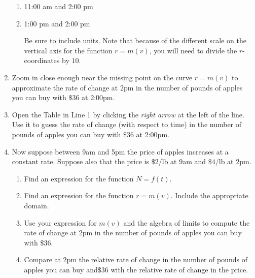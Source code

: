 \documentclass{ximera}
\begin{document}
\begin{question}
\begin{enumerate}
\begin{enumerate}
\item 11:00 am and 2:00 pm

\item 1:00 pm and 2:00 pm

Be sure to include units. Note that because of the different  scale on the vertical axis for the function $r=m(v)$, you will need to divide the $r$-coordinates by $10$.

\end{enumerate}

\item Zoom in close enough near the missing point on the curve $r=m(v)$ to approximate the rate of change at 2pm in the number of pounds of apples you can buy with $\$36$  at 2:00pm.

\item Open the Table in Line 1 by clicking the \emph{right arrow} at the left of the line. Use it to guess the rate of change (with respect to time) in the number of pounds of apples you can buy with $\$36$  at 2:00pm.

\item Now suppose between 9am and 5pm the price of apples increases at a constant rate. Suppose also that the price is $\$2$/lb at 9am and $\$4$/lb at 2pm. 

\begin{enumerate}
\item Find an expression for the function $N=f(t)$.

\item Find an expression for the function $r=m(v)$. Include the appropriate domain.

\item Use your expression for $m(v)$ and the algebra of limits to compute the rate of change at 2pm in the number of pounds of apples you can buy with $\$36$.

\item Compare at 2pm the relative rate of change in the number of pounds of apples you can buy and$\$36$ with the relative rate of change in the price.
\end{enumerate}

\end{enumerate}
\end{question}
\end{document}

